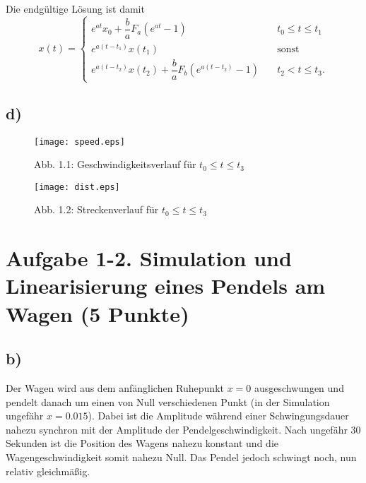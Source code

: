 \documentclass[11pt]{scrartcl} %
\begin{document}
Die endgültige Lösung ist damit
\begin{equation*}
x(t) = \left\{
        \begin{array}{lll}
            e^{at}x_0 + \dfrac{b}{a} F_a (e^{at} - 1) & \quad t_0\leq t \leq t_1 \\
            e^{a(t-t_1)}x(t_1) & \quad \text{sonst} \\
            e^{a(t-t_2)}x(t_2) + \dfrac{b}{a} F_b (e^{a(t-t_2)} - 1) & \quad t_2 < t \leq t_3.
        \end{array}
    \right.
\end{equation*}

\subsection*{d)}
\begin{figure}[H]
	\centering
	\texttt{[image: speed.eps]}
	\captionsetup{labelformat=empty}
	\caption{Abb. 1.1: Geschwindigkeitsverlauf für $t_0 \leq t \leq t_3$}
\end{figure}

\begin{figure}[H]
	\centering
	\texttt{[image: dist.eps]}
	\captionsetup{labelformat=empty}
	\caption{Abb. 1.2: Streckenverlauf für $t_0 \leq t \leq t_3$}
\end{figure}



\section*{Aufgabe 1-2. Simulation und Linearisierung eines Pendels am Wagen (5 Punkte)}

\subsection*{b)}
Der Wagen wird aus dem anfänglichen Ruhepunkt $x = 0$ ausgeschwungen und pendelt danach um einen von Null verschiedenen Punkt (in der Simulation ungefähr ${x = 0.015}$). Dabei ist die Amplitude während einer Schwingungsdauer nahezu synchron mit der Amplitude der Pendelgeschwindigkeit. Nach ungefähr 30 Sekunden ist die Position des Wagens nahezu konstant und die Wagengeschwindigkeit somit nahezu Null. Das Pendel jedoch schwingt noch, nun relativ gleichmäßig.
\end{document}
